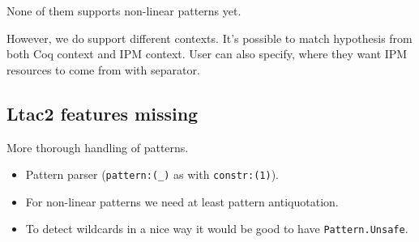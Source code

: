 None of them supports non-linear patterns yet.

However, we do support different contexts.
It's possible to match hypothesis from both Coq context and IPM context.
User can also specify, where they want IPM resources to come from with separator.


\subsection{Ltac2 features missing}

More thorough handling of patterns.
\begin{itemize}
\item Pattern parser (\verb|pattern:(_)| as with \verb|constr:(1)|).
\item For non-linear patterns we need at least pattern antiquotation.
\item To detect wildcards in a nice way it would be good to have \verb|Pattern.Unsafe|.
\end{itemize}

